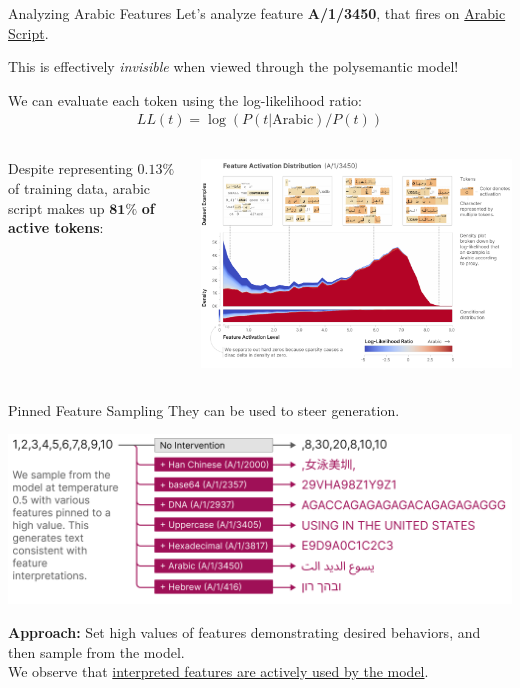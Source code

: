 \documentclass{beamer}
\begin{document}
\begin{frame}{Analyzing Arabic Features}
	Let's analyze feature \textbf{A/1/3450}, that fires on \underline{Arabic Script}. \pause

	\begin{block}{}
		This is effectively \textit{invisible} when viewed through the polysemantic model!
	\end{block} \pause
	We can evaluate each token using the log-likelihood ratio:
	\begin{gather}
		LL(t) = \log{(P(t|\text{Arabic})/P(t))}
	\end{gather}
	\begin{columns}
		\begin{column}{.3\textwidth}
			Despite representing $0.13\%$ of training data, arabic script makes up $\bm{81\%}$ \textbf{of active tokens}:
		\end{column}
		\begin{column}{.7\textwidth}
			\vspace{-2.5em}
			\begin{center}
				\includegraphics[width=.9\textwidth]{img/arabic.png}
			\end{center}
		\end{column}
	\end{columns}
\end{frame}

\begin{frame}{Pinned Feature Sampling}
	They can be used to steer generation.
	\begin{center}
		\includegraphics[width=.7\textwidth]{img/sampling.png}
	\end{center} \pause

	\textbf{Approach:} Set high values of features demonstrating desired behaviors, and then sample from the model. \pause \newline \\

	We observe that \underline{interpreted features are actively used by the model}.
\end{frame}
\end{document}
